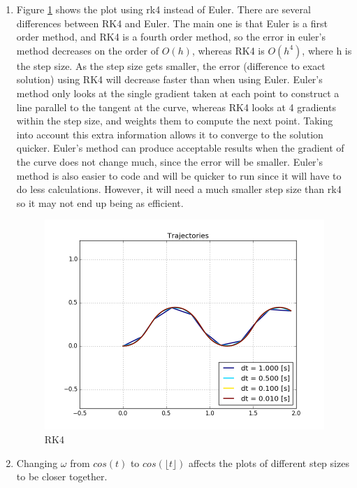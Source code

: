 \documentclass[12pt,a4paper]{article}
\begin{document}
\begin{enumerate}[label=(\alph*)]
	\item Figure \ref{fig:rk4} shows the plot using rk4 instead of Euler. There are several differences between RK4 and Euler. The main one is that Euler is a first order method, and RK4 is a fourth order method, so the error in euler's method decreases on the order of $O(h)$, whereas RK4 is $O(h^4)$, where h is the step size. As the step size gets smaller, the error (difference to exact solution) using RK4 will decrease faster than when using Euler. Euler's method only looks at the single gradient taken at each point to construct a line parallel to the tangent at the curve, whereas RK4 looks at 4 gradients within the step size, and weights them to compute the next point. Taking into account this extra information allows it to converge to the solution quicker. Euler's method can produce acceptable results when the gradient of the curve does not change much, since the error will be smaller. Euler's method is also easier to code and will be quicker to run since it will have to do less calculations. However, it will need a much smaller step size than rk4 so it may not end up being as efficient.
	      \begin{figure}[h]
	      	\centering
	      	\includegraphics[width=\textwidth]{fig/1e.png}
	      	\caption{RK4}
	      	\label{fig:rk4}	
	      \end{figure}
	\item Changing $\omega$ from $cos(t)$ to $cos(\lfloor t \rfloor)$ affects the plots of different step sizes to be closer together.
	      \begin{figure}[h]
	      	\centering

\end{figure}
\end{enumerate}
\end{document}
